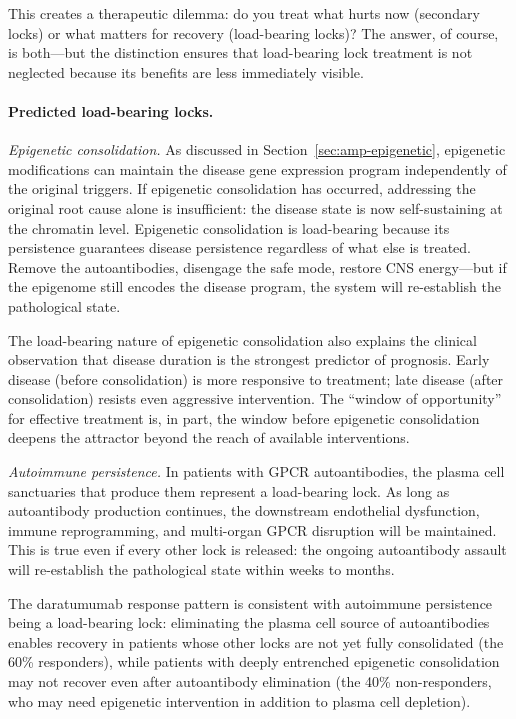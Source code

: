This creates a therapeutic dilemma: do you treat what hurts now (secondary locks) or what matters for recovery (load-bearing locks)? The answer, of course, is both---but the distinction ensures that load-bearing lock treatment is not neglected because its benefits are less immediately visible.

\paragraph{Predicted load-bearing locks.}

\emph{Epigenetic consolidation.} As discussed in Section~\ref{sec:amp-epigenetic}, epigenetic modifications can maintain the disease gene expression program independently of the original triggers. If epigenetic consolidation has occurred, addressing the original root cause alone is insufficient: the disease state is now self-sustaining at the chromatin level. Epigenetic consolidation is load-bearing because its persistence guarantees disease persistence regardless of what else is treated. Remove the autoantibodies, disengage the safe mode, restore CNS energy---but if the epigenome still encodes the disease program, the system will re-establish the pathological state.

The load-bearing nature of epigenetic consolidation also explains the clinical observation that disease duration is the strongest predictor of prognosis. Early disease (before consolidation) is more responsive to treatment; late disease (after consolidation) resists even aggressive intervention. The ``window of opportunity'' for effective treatment is, in part, the window before epigenetic consolidation deepens the attractor beyond the reach of available interventions.

\emph{Autoimmune persistence.} In patients with GPCR autoantibodies, the plasma cell sanctuaries that produce them represent a load-bearing lock. As long as autoantibody production continues, the downstream endothelial dysfunction, immune reprogramming, and multi-organ GPCR disruption will be maintained. This is true even if every other lock is released: the ongoing autoantibody assault will re-establish the pathological state within weeks to months.

The daratumumab response pattern is consistent with autoimmune persistence being a load-bearing lock: eliminating the plasma cell source of autoantibodies enables recovery in patients whose other locks are not yet fully consolidated (the 60\% responders), while patients with deeply entrenched epigenetic consolidation may not recover even after autoantibody elimination (the 40\% non-responders, who may need epigenetic intervention in addition to plasma cell depletion).

